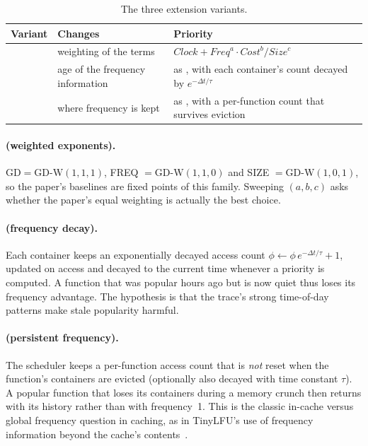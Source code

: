 \documentclass[11pt,a4paper]{article}
\newcommand{\gd}{\text{GD}}
\newcommand{\gdw}{\text{GD-W}}
\newcommand{\gdd}{\text{GD-D}}
\newcommand{\gdh}{\text{GD-H}}
\begin{document}
\begin{table}[H]
\centering
\caption{The three extension variants.}
\label{tab:variants}
\begin{tabular}{@{}llp{7.2cm}@{}}
\toprule
\textbf{Variant} & \textbf{Changes} & \textbf{Priority} \\
\midrule
\gdw{} & weighting of the terms & $\mathit{Clock} + \mathit{Freq}^{a}\cdot\mathit{Cost}^{b}/\mathit{Size}^{c}$ \\
\gdd{} & age of the frequency information & as \gd{}, with each container's count decayed by $e^{-\Delta t/\tau}$ \\
\gdh{} & where frequency is kept & as \gd{}, with a per-function count that survives eviction \\
\bottomrule
\end{tabular}
\end{table}

\paragraph{\gdw{} (weighted exponents).} $\gd{} = \gdw(1,1,1)$, FREQ $= \gdw(1,1,0)$ and SIZE
$= \gdw(1,0,1)$, so the paper's baselines are fixed points of this family. Sweeping $(a,b,c)$
asks whether the paper's equal weighting is actually the best choice.

\paragraph{\gdd{} (frequency decay).} Each container keeps an exponentially decayed access
count $\phi \leftarrow \phi\, e^{-\Delta t/\tau} + 1$, updated on access and decayed to the
current time whenever a priority is computed. A function that was popular hours ago but is now
quiet thus loses its frequency advantage. The hypothesis is that the trace's strong time-of-day
patterns make stale popularity harmful.

\paragraph{\gdh{} (persistent frequency).} The scheduler keeps a per-function access count
that is \emph{not} reset when the function's containers are evicted (optionally also decayed
with time constant $\tau$). A popular function that loses its containers during a memory
crunch then returns with its history rather than with frequency~1. This is the classic
in-cache versus global frequency question in caching, as in TinyLFU's use of frequency
information beyond the cache's contents~\cite{einziger2017tinylfu}.
\end{document}
